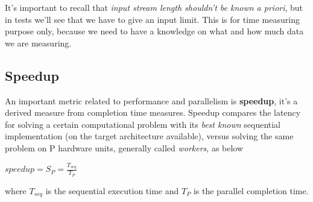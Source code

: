 It's important to recall that \textit{input stream length shouldn't be known a priori}, but in tests we'll see that we have to give an input limit. This is for time measuring purpose only, because we need to have a knowledge on what and how much data we are measuring.


\subsection{Speedup}
\label{subs:speedup}
An important metric related to performance and parallelism is \textbf{speedup}, it's a derived measure from completion time measures. Speedup compares the latency for solving a certain computational problem with its \textit{best known} sequential implementation (on the target architecture available), versus solving the same problem on P hardware units, generally called \textit{workers}, as below
\begin{center}
	\(speedup = S_{P} = \frac{T_{seq}}{T_{P}} \)
\end{center}


where \(T_{seq}\) is the sequential execution time and \(T_{P}\) is the parallel completion time.


